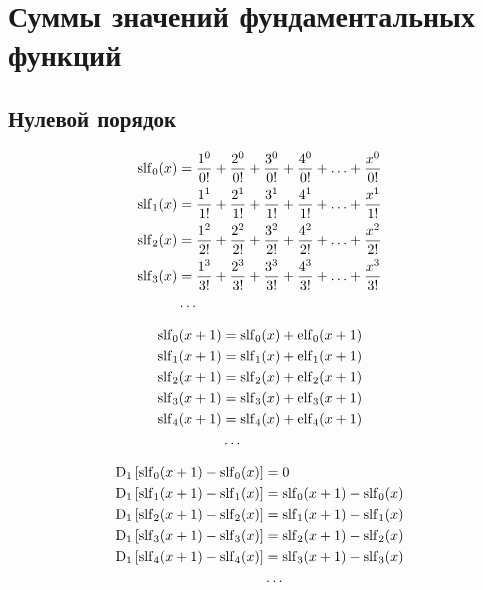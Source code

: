 
\section{Суммы значений фундаментальных функций}

\subsection{Нулевой порядок}

\begin{equation*} \begin{aligned}
\slf_0(x) &=
  \frac{1^0}{0!} 
+ \frac{2^0}{0!} 
+ \frac{3^0}{0!} 
+ \frac{4^0}{0!} 
+ \ldots 
+ \frac{x^0}{0!} \\
%
\slf_1(x) &= 
  \frac{1^1}{1!} 
+ \frac{2^1}{1!} 
+ \frac{3^1}{1!} 
+ \frac{4^1}{1!} 
+ \ldots 
+ \frac{x^1}{1!} \\
%
\slf_2(x) &= 
  \frac{1^2}{2!} 
+ \frac{2^2}{2!} 
+ \frac{3^2}{2!} 
+ \frac{4^2}{2!} 
+ \ldots 
+ \frac{x^2}{2!} \\
%
\slf_3(x) &= 
  \frac{1^3}{3!} 
+ \frac{2^3}{3!} 
+ \frac{3^3}{3!} 
+ \frac{4^3}{3!} 
+ \ldots 
+ \frac{x^3}{3!} \\
%
&\ldots \\
\end{aligned} \end{equation*}

\begin{equation*} \begin{aligned}
\operatorname{slf}_0(x + 1) &= 
  \operatorname{slf}_0(x) + \operatorname{elf}_0(x + 1)
\\
\operatorname{slf}_1(x + 1) &= 
  \operatorname{slf}_1(x) + \operatorname{elf}_1(x + 1)  
\\
\operatorname{slf}_2(x + 1) &= 
  \operatorname{slf}_2(x) + \operatorname{elf}_2(x + 1)  
\\
\operatorname{slf}_3(x + 1) &= 
  \operatorname{slf}_3(x) + \operatorname{elf}_3(x + 1)  
\\
\operatorname{slf}_4(x + 1) &= 
  \operatorname{slf}_4(x) + \operatorname{elf}_4(x + 1)  
\\
&\ldots \\
\end{aligned} \end{equation*}

\begin{equation*} \begin{aligned}
\mathrm{D}_1 \left[\operatorname{slf}_0(x + 1) - \operatorname{slf}_0(x) \right] &= 0
\\
\mathrm{D}_1 \left[\operatorname{slf}_1(x + 1) - \operatorname{slf}_1(x) \right] &= \operatorname{slf}_0(x + 1) - \operatorname{slf}_0(x)  
\\
\mathrm{D}_1 \left[\operatorname{slf}_2(x + 1) - \operatorname{slf}_2(x) \right] &= \operatorname{slf}_1(x + 1) - \operatorname{slf}_1(x)  
\\
\mathrm{D}_1 \left[\operatorname{slf}_3(x + 1) - \operatorname{slf}_3(x) \right] &= \operatorname{slf}_2(x + 1) - \operatorname{slf}_2(x)  
\\
\mathrm{D}_1 \left[\operatorname{slf}_4(x + 1) - \operatorname{slf}_4(x) \right] &= \operatorname{slf}_3(x + 1) - \operatorname{slf}_3(x)  
\\
&\ldots \\
\end{aligned} \end{equation*}

